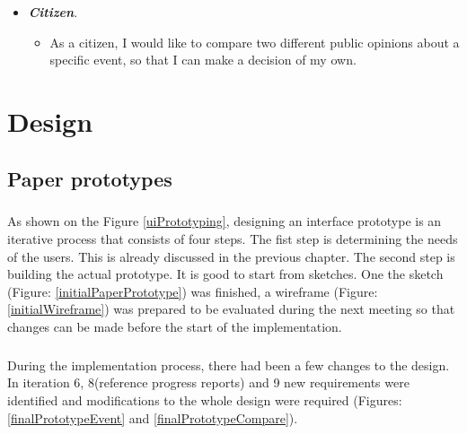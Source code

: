 \documentclass{l4proj}
\begin{document}
\begin{itemize}
	\item \textbf{\textit{Citizen}}.
	\begin{itemize}
		\item As a citizen, I would like to compare two different public opinions about a specific event, so that I can make a decision of my own. 
	\end{itemize}
\end{itemize}

\chapter{Design}

\section{Paper prototypes}
\label{sec:paper-prototypes}
\paragraph{}
As shown on the Figure \ref{uiPrototyping}, designing an interface prototype is an iterative process that consists of four steps. The fist step is determining the needs of the users. This is already discussed in the previous chapter. The second step is building the actual prototype. It is good to start from sketches. One the sketch (Figure: \ref{initialPaperPrototype}) was finished, a wireframe (Figure: \ref{initialWireframe}) was prepared to be evaluated during the next meeting so that changes can be made before the start of the implementation. 

\paragraph{}
During the implementation process, there had been a few changes to the design. In iteration 6, 8(reference progress reports) and 9 new requirements were identified and modifications to the whole design were required (Figures: \ref{finalPrototypeEvent} and \ref{finalPrototypeCompare}). 
\end{document}
